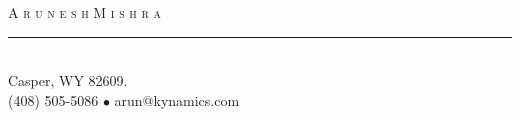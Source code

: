 
\setlength{\topmargin}{-0.6in}  %
\setlength{\textheight}{9.3in}  %
\addtolength{\textwidth}{-0.1in}  %
\setlength{\headrulewidth}{0pt} %
\setlength{\headsep}{0.2in}     %
\setlength{\headheight}{12pt}   %

\newdimen\mylinewidth 
\setlength{\mylinewidth}{\resumewidth}
\addtolength{\mylinewidth}{-0.4in}

\def\bull{\vrule height 0.8ex width .7ex depth -.1ex }
\newcommand{\lineunder}{\vspace*{-8pt} \\ \hspace*{-18pt} \rule{\mylinewidth}{0.5pt} \\}
\newcommand{\justline}{\hspace*{-18pt} \hrulefill \\\vspace{4pt}}
\newcommand{\header}[1]{{\hspace*{-15pt}\vspace*{2pt} \large{\textsc{#1}}} \vspace*{-2pt} \lineunder}
\newcommand{\contact}[3]{
\vspace*{-8pt}
\begin{center}
{\LARGE \scshape {#1}}
\lineunder
#2\\
#3
\end{center}
\vspace*{-8pt}
}

\lhead{\hspace*{-\sectionwidth}} %
\cfoot{}  %
\pagestyle{fancy} %
 
\contact{A r u n e s h \hspace{3mm}    M i s h r a}
{  Casper, WY 82609.}
{(408) 505-5086 $\bullet$ arun@kynamics.com}
\thispagestyle{empty} %

